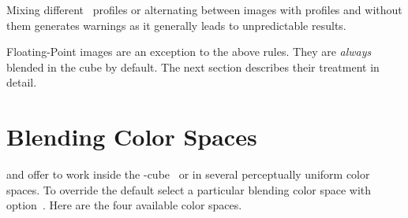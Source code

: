 Mixing different ~profiles or alternating between images with profiles and without
them generates warnings as it generally leads to unpredictable results.

Floating-Point images are an exception to the above rules.  They are \emph{always} blended in
the  cube by default.  The next section describes their treatment in detail.


\section[Blending Color Spaces]{\label{sec:blending-color-spaces}%
  Blending Color Spaces}

\App{} and \OtherApp{} offer to work inside the -cube~ or in
several perceptually uniform color spaces.  To override the default select a particular blending
color space with option~.  Here
are the four available color spaces.

